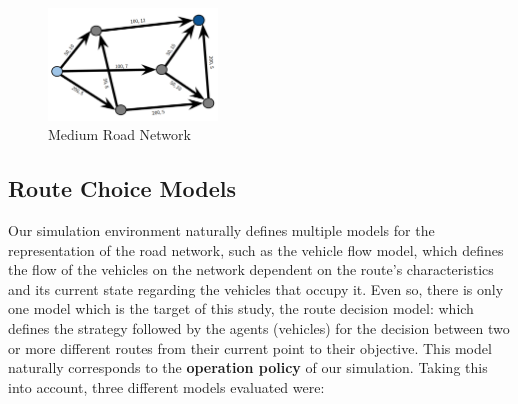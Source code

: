 \begin{figure}
    \centering
    \includegraphics[width=0.4\textwidth]{img/medium.png}
    \caption{Medium Road Network}
    \label{fig:medium-road-network}
\end{figure}

\subsection{Route Choice Models}

Our simulation environment naturally defines multiple models for the representation of the road network, such as the vehicle flow model, which defines the flow of the vehicles on the network dependent on the route's characteristics and its current state regarding the vehicles that occupy it. Even so, there is only one model which is the target of this study, the route decision model: which defines the strategy followed by the agents (vehicles) for the decision between two or more different routes from their current point to their objective. This model naturally corresponds to the \textbf{operation policy} of our simulation. Taking this into account, three different models evaluated were:

